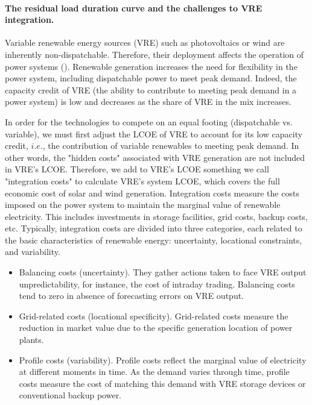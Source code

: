 \paragraph{The residual load duration curve and the challenges to VRE integration.}

Variable renewable energy sources (VRE) such as photovoltaics or wind are inherently non-dispatchable. Therefore, their deployment affects the operation of power systems (\cite{Hirth2015}). Renewable generation increases the need for flexibility in the power system, including dispatchable power to meet peak demand. Indeed, the capacity credit of VRE (the ability to contribute to meeting peak demand in a power system) is low and decreases as the share of VRE in the mix increases.

In order for the technologies to compete on an equal footing (dispatchable vs. variable), we must first adjust the LCOE of VRE to account for its low capacity credit, $i.e.$, the contribution of variable renewables to meeting peak demand. In other words, the "hidden costs" associated with VRE generation are not included in VRE's LCOE. Therefore, we add to VRE's LCOE something we call "integration costs" to calculate VRE's system LCOE, which covers the full economic cost of solar and wind generation. Integration costs measure the costs imposed on the power system to maintain the marginal value of renewable electricity. This includes investments in storage facilities, grid costs, backup costs, etc. Typically, integration costs are divided into three categories, each related to the basic characteristics of renewable energy: uncertainty, locational constraints, and variability.
\begin{itemize}
    \item Balancing costs (uncertainty). They gather actions taken to face VRE output unpredictability, for instance, the cost of intraday trading. Balancing costs tend to zero in absence of forecasting errors on VRE output.
    \item Grid-related costs (locational specificity). Grid-related costs measure the reduction in market value due to the specific generation location of power plants.
    \item Profile costs (variability). Profile costs reflect the marginal value of electricity at different moments in time. As the demand varies through time, profile costs measure the cost of matching this demand with VRE storage devices or conventional backup power.
\end{itemize}

